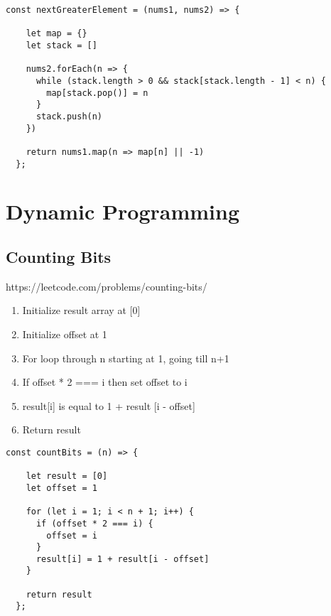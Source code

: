 \documentclass[10pt]{article}
\begin{document}
\begin{lstlisting}[title=Solution nextGreaterElement, captionpos=t]
const nextGreaterElement = (nums1, nums2) => {
    
    let map = {}
    let stack = []
      
    nums2.forEach(n => {
      while (stack.length > 0 && stack[stack.length - 1] < n) {
        map[stack.pop()] = n
      }
      stack.push(n)
    })
      
    return nums1.map(n => map[n] || -1)
  };
\end{lstlisting}

\medskip %













\pagebreak
\section{Dynamic Programming}



\medskip   
\subsection{Counting Bits}
https://leetcode.com/problems/counting-bits/

\begin{enumerate}
	\item Initialize result array at [0]
	\item Initialize offset at 1
	\item For loop through n starting at 1, going till n+1
	\item If offset * 2 === i then set offset to i 
	\item result[i] is equal to 1 + result [i - offset]
	\item Return result
\end{enumerate}

\begin{lstlisting}[title=Solution countBits, captionpos=t]
const countBits = (n) => {
    
    let result = [0]
    let offset = 1
      
    for (let i = 1; i < n + 1; i++) {
      if (offset * 2 === i) {
        offset = i
      }
      result[i] = 1 + result[i - offset]
    }
  
    return result
  };
  \end{lstlisting}
\end{document}
